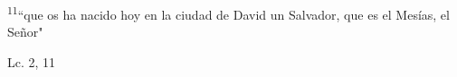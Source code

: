 \documentclass[../../rosario.tex]{subfiles}
\begin{document}
    \textsuperscript{11}``que os ha nacido hoy en la ciudad de David un Salvador, que es el Mesías, el Señor"
    \begin{flushright}
    Lc. 2, 11       
    \end{flushright}
\end{document}
